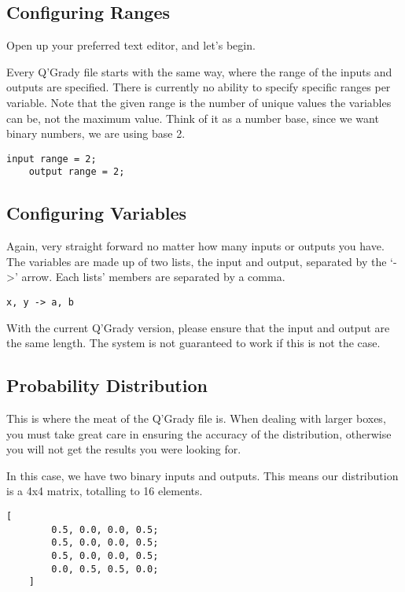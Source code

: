 \documentclass[report.tex]{subfiles}
\begin{document}
\subsection{Configuring Ranges} %
\label{sub:configuring_ranges}
Open up your preferred text editor, and let's begin. 

Every Q'Grady file starts with the same way, where the range of the inputs
and outputs are specified. There is currently no ability to specify specific
ranges per variable. Note that the given range is the number of unique values
the variables can be, not the maximum value. Think of it as a number base, since
we want binary numbers, we are using base 2.

\begin{lstlisting}[frame = single]
    input range = 2;
    output range = 2;
\end{lstlisting}

\subsection{Configuring Variables} %
\label{sub:configuring_variables}
Again, very straight forward no matter how many inputs or outputs you have.
The variables are made up of two lists, the input and output, separated by the
`->' arrow. Each lists' members are separated by a comma.

\begin{lstlisting}[frame = single]
    x, y -> a, b
\end{lstlisting}

With the current Q'Grady version, please ensure that the input and output are
the same length. The system is not guaranteed to work if this is not the case.

\subsection{Probability Distribution} %
\label{sub:probability_distribution}
This is where the meat of the Q'Grady file is. When dealing with larger boxes,
you must take great care in ensuring the accuracy of the distribution, otherwise
you will not get the results you were looking for.

In this case, we have two binary inputs and outputs. This means our distribution
is a 4x4 matrix, totalling to 16 elements.

\begin{lstlisting}[frame = single]
    [
        0.5, 0.0, 0.0, 0.5;
        0.5, 0.0, 0.0, 0.5;
        0.5, 0.0, 0.0, 0.5;
        0.0, 0.5, 0.5, 0.0;
    ]    
\end{lstlisting}
\end{document}
